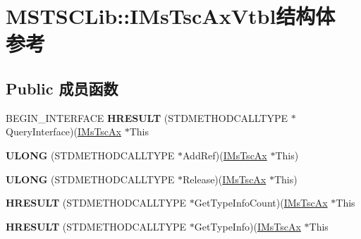 \hypertarget{struct_m_s_t_s_c_lib_1_1_i_ms_tsc_ax_vtbl}{}\section{M\+S\+T\+S\+C\+Lib\+:\+:I\+Ms\+Tsc\+Ax\+Vtbl结构体 参考}
\label{struct_m_s_t_s_c_lib_1_1_i_ms_tsc_ax_vtbl}
\subsection*{Public 成员函数}
\begin{DoxyCompactItemize}
\item 
\mbox{\label{struct_m_s_t_s_c_lib_1_1_i_ms_tsc_ax_vtbl_a71f96787b31c950da8e778b223cceb81}} 
B\+E\+G\+I\+N\+\_\+\+I\+N\+T\+E\+R\+F\+A\+CE {\bfseries H\+R\+E\+S\+U\+LT} (S\+T\+D\+M\+E\+T\+H\+O\+D\+C\+A\+L\+L\+T\+Y\+PE $\ast$Query\+Interface)(\hyperlink{interface_m_s_t_s_c_lib_1_1_i_ms_tsc_ax}{I\+Ms\+Tsc\+Ax} $\ast$This
\item 
\mbox{\label{struct_m_s_t_s_c_lib_1_1_i_ms_tsc_ax_vtbl_ab7802abc7cc07cad099dea7ac2281aac}} 
{\bfseries U\+L\+O\+NG} (S\+T\+D\+M\+E\+T\+H\+O\+D\+C\+A\+L\+L\+T\+Y\+PE $\ast$Add\+Ref)(\hyperlink{interface_m_s_t_s_c_lib_1_1_i_ms_tsc_ax}{I\+Ms\+Tsc\+Ax} $\ast$This)
\item 
\mbox{\label{struct_m_s_t_s_c_lib_1_1_i_ms_tsc_ax_vtbl_ae587812fe87eb73c83be79331b3fa56c}} 
{\bfseries U\+L\+O\+NG} (S\+T\+D\+M\+E\+T\+H\+O\+D\+C\+A\+L\+L\+T\+Y\+PE $\ast$Release)(\hyperlink{interface_m_s_t_s_c_lib_1_1_i_ms_tsc_ax}{I\+Ms\+Tsc\+Ax} $\ast$This)
\item 
\mbox{\label{struct_m_s_t_s_c_lib_1_1_i_ms_tsc_ax_vtbl_adef5d06d32a99af9c1404397fbe1fd48}} 
{\bfseries H\+R\+E\+S\+U\+LT} (S\+T\+D\+M\+E\+T\+H\+O\+D\+C\+A\+L\+L\+T\+Y\+PE $\ast$Get\+Type\+Info\+Count)(\hyperlink{interface_m_s_t_s_c_lib_1_1_i_ms_tsc_ax}{I\+Ms\+Tsc\+Ax} $\ast$This
\item 
\mbox{\label{struct_m_s_t_s_c_lib_1_1_i_ms_tsc_ax_vtbl_a6fbeec070b6bc482043d29450990c30b}} 
{\bfseries H\+R\+E\+S\+U\+LT} (S\+T\+D\+M\+E\+T\+H\+O\+D\+C\+A\+L\+L\+T\+Y\+PE $\ast$Get\+Type\+Info)(\hyperlink{interface_m_s_t_s_c_lib_1_1_i_ms_tsc_ax}{I\+Ms\+Tsc\+Ax} $\ast$This

\end{DoxyCompactItemize}

